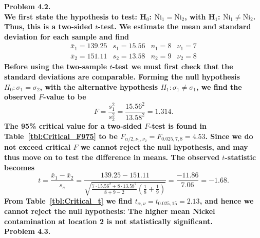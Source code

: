 \noindent
\bf{Problem 4.2.} \\

We first state the hypothesis to test: H$_0$: $\bar{\mbox{Ni}}_1 = \bar{\mbox{Ni}}_2$,
with H$_1$: $\bar{\mbox{Ni}}_1 \neq \bar{\mbox{Ni}}_2$.  Thus, this is a two-sided $t$-test.
We estimate the mean and standard deviation for each sample and find
\[ \begin{array}{cccc}
\bar{x}_1 = 139.25 & s_1 = 15.56 & n_1 = 8 & \nu_1 = 7 \\
\bar{x}_2 = 151.11 & s_2 = 13.58 & n_2 = 9 & \nu_2 = 8
\end{array}
\]
Before using the two-sample $t$-test we must first check that the standard deviations are
comparable.  Forming the null hypothesis $H_0: \sigma_1 = \sigma_2$, with the alternative
hypothesis $H_1: \sigma_1 \neq \sigma_1$, we find the observed $F$-value to be
\[ F = \frac{s_1^2}{s_2^2} = \frac{15.56^2}{13.58^2} = 1.314. \]
The 95\% critical value for a two-sided $F$-test is found in Table~\ref{tbl:Critical_F975} to be
$F_{\alpha/2,\nu_1,\nu_2} = F_{0.025,7,8} = 4.53$.
Since we do not exceed critical $F$ we cannot reject the null hypothesis, and may thus move on to test
the difference in means. The observed $t$-statistic becomes
\[ t = \frac{\bar{x}_1 - \bar{x}_2}{s_e} =
\frac{139.25 - 151.11}{\sqrt{\frac{7\cdot15.56^2 + 8\cdot13.58^2}{8 + 9 - 2} \left( \frac{1}{8} + \frac{1}{9} \right)}} = \frac{-11.86}{7.06} = -1.68.
\]
From Table~\ref{tbl:Critical_t} we find $t_{\alpha,\nu} = t_{0.025,15} = 2.13$, and hence we cannot
reject the null hypothesis: The higher mean Nickel contamination at location 2 is not statistically significant.
\\

\noindent
\bf{Problem 4.3.} \\

